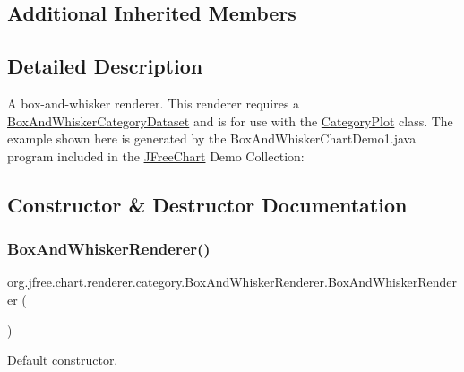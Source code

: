 \subsection*{Additional Inherited Members}


\subsection{Detailed Description}
A box-\/and-\/whisker renderer. This renderer requires a \mbox{\hyperlink{}{Box\+And\+Whisker\+Category\+Dataset}} and is for use with the \mbox{\hyperlink{}{Category\+Plot}} class. The example shown here is generated by the {\ttfamily Box\+And\+Whisker\+Chart\+Demo1.\+java} program included in the \mbox{\hyperlink{classorg_1_1jfree_1_1chart_1_1_j_free_chart}{J\+Free\+Chart}} Demo Collection\+: ~\newline
~\newline
  

\subsection{Constructor \& Destructor Documentation}
\mbox{\label{classorg_1_1jfree_1_1chart_1_1renderer_1_1category_1_1_box_and_whisker_renderer_aa0fefbd4a1036ac80b0def6bb8d52c1d}} 
\subsubsection{\texorpdfstring{Box\+And\+Whisker\+Renderer()}{BoxAndWhiskerRenderer()}}
{\footnotesize\ttfamily org.\+jfree.\+chart.\+renderer.\+category.\+Box\+And\+Whisker\+Renderer.\+Box\+And\+Whisker\+Renderer (\begin{DoxyParamCaption}{ }\end{DoxyParamCaption})}

Default constructor. 

